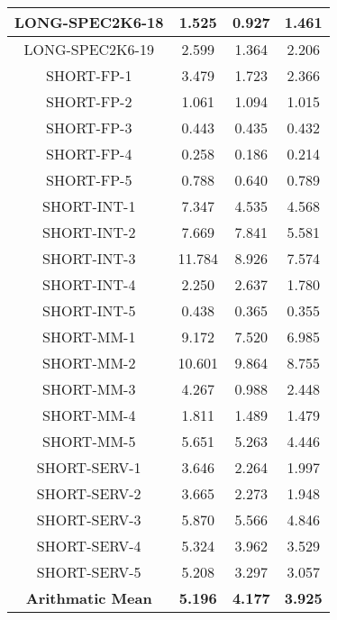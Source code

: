 \documentclass[paper=letter, fontsize=12pt]{article}
\begin{document}
\begin{table}[!h]
\begin{center}
\begin{tabular}{| c | c | c | c |}
LONG-SPEC2K6-18     &        1.525  &       0.927    &      1.461 \\ \hline   
LONG-SPEC2K6-19     &        2.599  &       1.364    &      2.206 \\ \hline   
SHORT-FP-1          &        3.479  &       1.723    &      2.366 \\ \hline   
SHORT-FP-2          &        1.061  &       1.094    &      1.015 \\ \hline   
SHORT-FP-3          &        0.443  &       0.435    &      0.432 \\ \hline   
SHORT-FP-4          &        0.258  &       0.186    &      0.214 \\ \hline   
SHORT-FP-5          &        0.788  &       0.640    &      0.789 \\ \hline   
SHORT-INT-1         &        7.347  &       4.535    &      4.568 \\ \hline   
SHORT-INT-2         &        7.669  &       7.841    &      5.581 \\ \hline   
SHORT-INT-3         &       11.784  &       8.926    &      7.574 \\ \hline   
SHORT-INT-4         &        2.250  &       2.637    &      1.780 \\ \hline   
SHORT-INT-5         &        0.438  &       0.365    &      0.355 \\ \hline   
SHORT-MM-1          &        9.172  &       7.520    &      6.985 \\ \hline   
SHORT-MM-2          &       10.601  &       9.864    &      8.755 \\ \hline   
SHORT-MM-3          &        4.267  &       0.988    &      2.448 \\ \hline   
SHORT-MM-4          &        1.811  &       1.489    &      1.479 \\ \hline   
SHORT-MM-5          &        5.651  &       5.263    &      4.446 \\ \hline   
SHORT-SERV-1        &        3.646  &       2.264    &      1.997 \\ \hline   
SHORT-SERV-2        &        3.665  &       2.273    &      1.948 \\ \hline   
SHORT-SERV-3        &        5.870  &       5.566    &      4.846 \\ \hline   
SHORT-SERV-4        &        5.324  &       3.962    &      3.529 \\ \hline   
SHORT-SERV-5        &        5.208  &       3.297    &      3.057 \\ \hline   
\textbf{Arithmatic Mean}     &        \textbf{5.196}  &       \textbf{4.177}    &      \textbf{3.925} \\ \hline   

\end{tabular}
\end{center}
\end{table}
\end{document}
